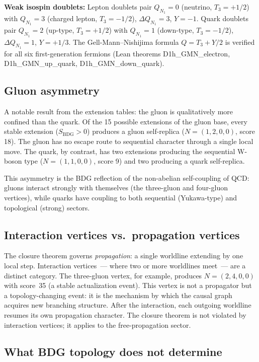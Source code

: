 \documentclass[11pt,a4paper]{article}
\newcommand{\SBDG}{S_{\mathrm{BDG}}}
\begin{document}
\noindent\textbf{Weak isospin doublets:}
Lepton doublets pair $Q_{N_1}=0$ (neutrino, $T_3=+1/2$) with
$Q_{N_1}=3$ (charged lepton, $T_3=-1/2$), $\Delta Q_{N_1}=3$,
$Y=-1$. Quark doublets pair $Q_{N_1}=2$ (up-type, $T_3=+1/2$)
with $Q_{N_1}=1$ (down-type, $T_3=-1/2$), $\Delta Q_{N_1}=1$,
$Y=+1/3$. The Gell-Mann--Nishijima formula $Q=T_3+Y/2$ is verified
for all six first-generation fermions (Lean theorems D1h\_GMN\_electron,
D1h\_GMN\_up\_quark, D1h\_GMN\_down\_quark).

\subsection{Gluon asymmetry}

A notable result from the extension tables: the gluon is qualitatively
more confined than the quark. Of the 15 possible extensions of the
gluon base, every stable extension ($\SBDG > 0$) produces a gluon
self-replica ($N=(1,2,0,0)$, score 18). The gluon has no escape route
to sequential character through a single local move. The quark, by
contrast, has two extensions producing the sequential W-boson type
($N=(1,1,0,0)$, score 9) and two producing a quark self-replica.

This asymmetry is the BDG reflection of the non-abelian self-coupling
of QCD: gluons interact strongly with themselves (the three-gluon and
four-gluon vertices), while quarks have coupling to both sequential
(Yukawa-type) and topological (strong) sectors.

\subsection{Interaction vertices vs.\ propagation vertices}

The closure theorem governs \emph{propagation}: a single worldline
extending by one local step. Interaction vertices~--- where two or more
worldlines meet~--- are a distinct category. The three-gluon vertex,
for example, produces $N=(2,4,0,0)$ with score~35 (a stable
actualization event). This vertex is not a propagator but a topology-changing
event: it is the mechanism by which the causal graph acquires new
branching structure. After the interaction, each outgoing worldline
resumes its own propagation character. The closure theorem is not
violated by interaction vertices; it applies to the free-propagation
sector.

\subsection{What BDG topology does not determine}
\end{document}
